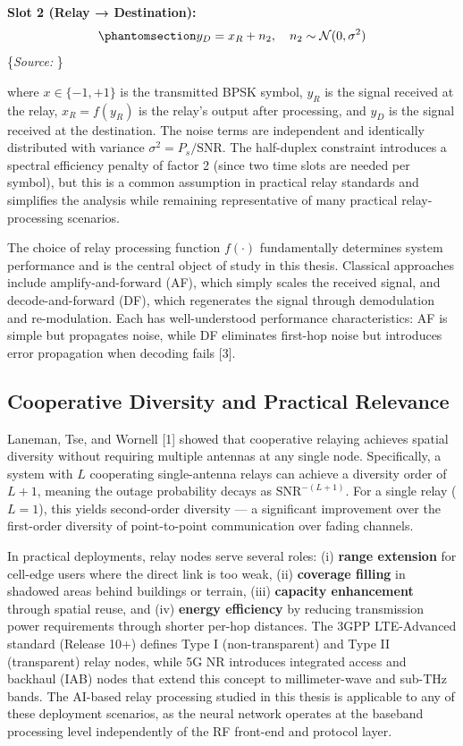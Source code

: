 \documentclass[
  english,
  12pt,
  12pt,
  a4paper,
  oneside]{report}
\begin{document}
\textbf{Slot 2 (Relay → Destination):} \begin{equation}\protect\phantomsection\label{eq:awgn-hop2}{y_D = x_R + n_2, \quad n_2 \sim \mathcal{N}(0, \sigma^2)
}\end{equation} \footnotesize\{\textit{Source: \1}\}\normalsize

where \(x \in \{-1, +1\}\) is the transmitted BPSK symbol, \(y_R\) is the signal received at the relay, \(x_R = f(y_R)\) is the relay's output after processing, and \(y_D\) is the signal received at the destination. The noise terms are independent and identically distributed with variance \(\sigma^2 = P_s / \text{SNR}\). The half-duplex constraint introduces a spectral efficiency penalty of factor 2 (since two time slots are needed per symbol), but this is a common assumption in practical relay standards and simplifies the analysis while remaining representative of many practical relay-processing scenarios.

The choice of relay processing function \(f(\cdot)\) fundamentally determines system performance and is the central object of study in this thesis. Classical approaches include amplify-and-forward (AF), which simply scales the received signal, and decode-and-forward (DF), which regenerates the signal through demodulation and re-modulation. Each has well-understood performance characteristics: AF is simple but propagates noise, while DF eliminates first-hop noise but introduces error propagation when decoding fails {[}3{]}.

\subsection{Cooperative Diversity and Practical Relevance}\label{sec:cooperative-diversity-and-practical-relevance}

Laneman, Tse, and Wornell {[}1{]} showed that cooperative relaying achieves spatial diversity without requiring multiple antennas at any single node. Specifically, a system with \(L\) cooperating single-antenna relays can achieve a diversity order of \(L + 1\), meaning the outage probability decays as \(\text{SNR}^{-(L+1)}\). For a single relay (\(L=1\)), this yields second-order diversity --- a significant improvement over the first-order diversity of point-to-point communication over fading channels.

In practical deployments, relay nodes serve several roles: (i) \textbf{range extension} for cell-edge users where the direct link is too weak, (ii) \textbf{coverage filling} in shadowed areas behind buildings or terrain, (iii) \textbf{capacity enhancement} through spatial reuse, and (iv) \textbf{energy efficiency} by reducing transmission power requirements through shorter per-hop distances. The 3GPP LTE-Advanced standard (Release 10+) defines Type I (non-transparent) and Type II (transparent) relay nodes, while 5G NR introduces integrated access and backhaul (IAB) nodes that extend this concept to millimeter-wave and sub-THz bands. The AI-based relay processing studied in this thesis is applicable to any of these deployment scenarios, as the neural network operates at the baseband processing level independently of the RF front-end and protocol layer.
\end{document}

